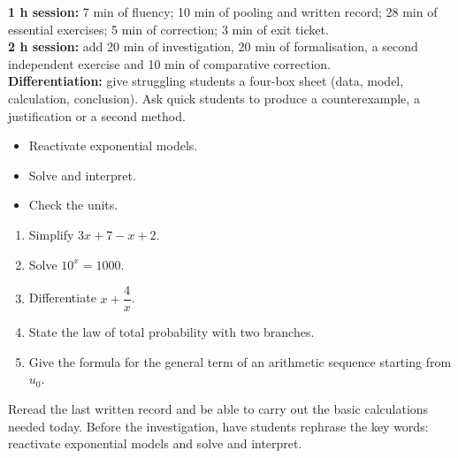 \ifprof
\begin{methode}
\textbf{1 h session:} 7 min of fluency; 10 min of pooling and written record; 28 min of essential exercises; 5 min of correction; 3 min of exit ticket.\\
\textbf{2 h session:} add 20 min of investigation, 20 min of formalisation, a second independent exercise and 10 min of comparative correction.\\
\textbf{Differentiation:} give struggling students a four-box sheet (data, model, calculation, conclusion). Ask quick students to produce a counterexample, a justification or a second method.
\end{methode}
\fi
{}
\begin{objectifs}\begin{itemize}\item Reactivate exponential models.\item Solve and interpret.\item Check the units.\end{itemize}\end{objectifs}
\begin{automatismes}\begin{enumerate}\item Simplify $3x+7-x+2$. \item Solve $10^x=1000$. \item Differentiate $x+\dfrac4x$. \item State the law of total probability with two branches. \item Give the formula for the general term of an arithmetic sequence starting from $u_0$. \end{enumerate}\end{automatismes}
\begin{prerequis}Reread the last written record and be able to carry out the basic calculations needed today. Before the investigation, have students rephrase the key words: reactivate exponential models and solve and interpret.\end{prerequis}


